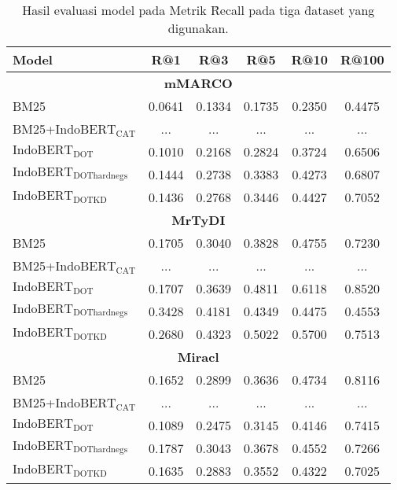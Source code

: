 \newpage

\begin{table}
    \centering
    \caption{Hasil evaluasi model pada Metrik \f{Recall} pada tiga \f{dataset} yang digunakan.}
    \label{tab:evalrecall}
    \begin{tabular}{lccccc}
        \hline
        Model & R@1 & R@3 & R@5 & R@10 & R@100 \\ 
        \hline
        \multicolumn{6}{c}{\textbf{mMARCO}} \\
        BM25 & 0.0641 & 0.1334 & 0.1735 & 0.2350 & 0.4475 \\
        BM25+$\text{IndoBERT}_{\text{CAT}}$  & ... & ... & ... & ... & ... \\
        $\text{IndoBERT}_{\text{DOT}}$ & 0.1010 & 0.2168 & 0.2824 & 0.3724 & 0.6506 \\
        $\text{IndoBERT}_{\text{DOThardnegs}} $ & 0.1444 & 0.2738 & 0.3383 & 0.4273 & 0.6807 \\
        $\text{IndoBERT}_{\text{DOTKD}}$ & 0.1436 & 0.2768 & 0.3446 & 0.4427 & 0.7052 \\
        \hline
        \multicolumn{6}{c}{\textbf{MrTyDI}} \\
        BM25 & 0.1705 & 0.3040 & 0.3828 & 0.4755 & 0.7230 \\
        BM25+$\text{IndoBERT}_{\text{CAT}}$  & ... & ... & ... & ... & ... \\
        $\text{IndoBERT}_{\text{DOT}}$ & 0.1707 & 0.3639 & 0.4811 & 0.6118 & 0.8520 \\
        $\text{IndoBERT}_{\text{DOThardnegs}} $ & 0.3428 & 0.4181 & 0.4349 & 0.4475 & 0.4553 \\
        $\text{IndoBERT}_{\text{DOTKD}}$ & 0.2680 & 0.4323 & 0.5022 & 0.5700 & 0.7513 \\
        \hline
        \multicolumn{6}{c}{\textbf{Miracl}} \\
        BM25 & 0.1652 & 0.2899 & 0.3636 & 0.4734 & 0.8116 \\
        BM25+$\text{IndoBERT}_{\text{CAT}}$  & ... & ... & ... & ... & ... \\
        $\text{IndoBERT}_{\text{DOT}}$ & 0.1089 & 0.2475 & 0.3145 & 0.4146 & 0.7415 \\
        $\text{IndoBERT}_{\text{DOThardnegs}} $ & 0.1787 & 0.3043 & 0.3678 & 0.4552 & 0.7266 \\
        $\text{IndoBERT}_{\text{DOTKD}}$ & 0.1635 & 0.2883 & 0.3552 & 0.4322 & 0.7025 \\
        \hline
        
        \end{tabular}
        
\end{table}


